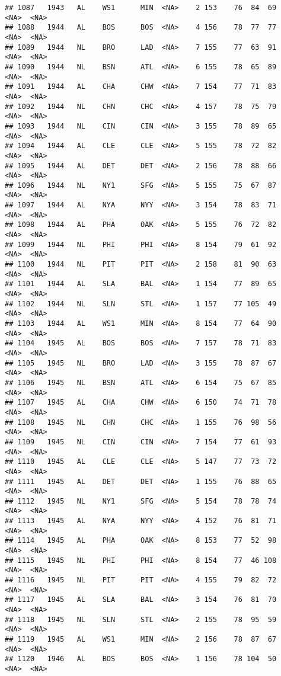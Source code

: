 \documentclass[]{article}
\begin{document}
\begin{verbatim}
## 1087   1943   AL    WS1      MIN  <NA>    2 153    76  84  69   <NA>  <NA>
## 1088   1944   AL    BOS      BOS  <NA>    4 156    78  77  77   <NA>  <NA>
## 1089   1944   NL    BRO      LAD  <NA>    7 155    77  63  91   <NA>  <NA>
## 1090   1944   NL    BSN      ATL  <NA>    6 155    78  65  89   <NA>  <NA>
## 1091   1944   AL    CHA      CHW  <NA>    7 154    77  71  83   <NA>  <NA>
## 1092   1944   NL    CHN      CHC  <NA>    4 157    78  75  79   <NA>  <NA>
## 1093   1944   NL    CIN      CIN  <NA>    3 155    78  89  65   <NA>  <NA>
## 1094   1944   AL    CLE      CLE  <NA>    5 155    78  72  82   <NA>  <NA>
## 1095   1944   AL    DET      DET  <NA>    2 156    78  88  66   <NA>  <NA>
## 1096   1944   NL    NY1      SFG  <NA>    5 155    75  67  87   <NA>  <NA>
## 1097   1944   AL    NYA      NYY  <NA>    3 154    78  83  71   <NA>  <NA>
## 1098   1944   AL    PHA      OAK  <NA>    5 155    76  72  82   <NA>  <NA>
## 1099   1944   NL    PHI      PHI  <NA>    8 154    79  61  92   <NA>  <NA>
## 1100   1944   NL    PIT      PIT  <NA>    2 158    81  90  63   <NA>  <NA>
## 1101   1944   AL    SLA      BAL  <NA>    1 154    77  89  65   <NA>  <NA>
## 1102   1944   NL    SLN      STL  <NA>    1 157    77 105  49   <NA>  <NA>
## 1103   1944   AL    WS1      MIN  <NA>    8 154    77  64  90   <NA>  <NA>
## 1104   1945   AL    BOS      BOS  <NA>    7 157    78  71  83   <NA>  <NA>
## 1105   1945   NL    BRO      LAD  <NA>    3 155    78  87  67   <NA>  <NA>
## 1106   1945   NL    BSN      ATL  <NA>    6 154    75  67  85   <NA>  <NA>
## 1107   1945   AL    CHA      CHW  <NA>    6 150    74  71  78   <NA>  <NA>
## 1108   1945   NL    CHN      CHC  <NA>    1 155    76  98  56   <NA>  <NA>
## 1109   1945   NL    CIN      CIN  <NA>    7 154    77  61  93   <NA>  <NA>
## 1110   1945   AL    CLE      CLE  <NA>    5 147    77  73  72   <NA>  <NA>
## 1111   1945   AL    DET      DET  <NA>    1 155    76  88  65   <NA>  <NA>
## 1112   1945   NL    NY1      SFG  <NA>    5 154    78  78  74   <NA>  <NA>
## 1113   1945   AL    NYA      NYY  <NA>    4 152    76  81  71   <NA>  <NA>
## 1114   1945   AL    PHA      OAK  <NA>    8 153    77  52  98   <NA>  <NA>
## 1115   1945   NL    PHI      PHI  <NA>    8 154    77  46 108   <NA>  <NA>
## 1116   1945   NL    PIT      PIT  <NA>    4 155    79  82  72   <NA>  <NA>
## 1117   1945   AL    SLA      BAL  <NA>    3 154    76  81  70   <NA>  <NA>
## 1118   1945   NL    SLN      STL  <NA>    2 155    78  95  59   <NA>  <NA>
## 1119   1945   AL    WS1      MIN  <NA>    2 156    78  87  67   <NA>  <NA>
## 1120   1946   AL    BOS      BOS  <NA>    1 156    78 104  50   <NA>  <NA>

\end{verbatim}
\end{document}
